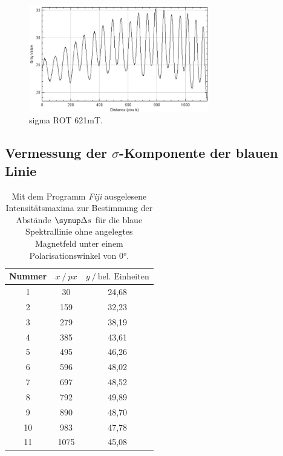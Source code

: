 \begin{figure}
  \centering
  \includegraphics[width=0.7\textwidth]{bilder/sigmaROT_620mT.PNG}
  \caption{sigma ROT 621mT.}
  \label{abb:plotsigmarot621mT}
\end{figure}


\subsection{Vermessung der \texorpdfstring{$\sigma$}{sigma}-Komponente der blauen Linie}

\begin{table}[H]
  \centering
  \caption{Mit dem Programm \textit{Fiji} \cite{Fiji} ausgelesene Intensitätsmaxima zur Bestimmung der Abstände $\Deltaup s$ für die blaue Spektrallinie ohne angelegtes Magnetfeld  unter einem Polarisationswinkel von $0°$.}
  \label{tab:277-Max}
  \begin{tabular}{c|cc}
    \toprule
    {Nummer} & {$x \:/\: \si{px}$} & {$y \:/\: \text{bel. Einheiten}$}\\
    \midrule
 1 &   30  &	 24,68 \\
 2 &   159  &	 32,23 \\
 3 &  279  &	 38,19 \\
 4 &  385  &	 43,61 \\
 5 &  495  &	 46,26 \\
 6 &  596  &	 48,02 \\
 7 &  697  &	 48,52 \\
 8 &  792  &	 49,89 \\
 9 &  890  &   48,70 \\
10 &  983  &	 47,78 \\
11 &  1075  &	 45,08 \\
  \end{tabular}
\end{table}


